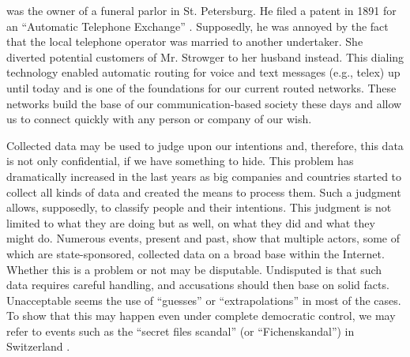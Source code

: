 \documentclass[10pt,journal,compsoc,twocolumn,twoside]{IEEEtran}
\begin{document}
% 
% 
% 
% 
 was the owner of a funeral parlor in St. Petersburg. He filed a patent in 1891 for an ``Automatic Telephone Exchange'' \cite{pulseDialingPatent}. Supposedly, he was annoyed by the fact that the local telephone operator was married to another undertaker. She diverted potential customers of Mr. Strowger to her husband instead. This dialing technology enabled automatic routing for voice and text messages (e.g., telex) up until today and is one of the foundations for our current routed networks. These networks build the base of our communication-based society these days and allow us to connect quickly with any person or company of our wish.

Collected data may be used to judge upon our intentions and, therefore, this data is not only confidential, if we have something to hide. This problem has dramatically increased in the last years as big companies and countries started to collect all kinds of data and created the means to process them. Such a judgment allows, supposedly, to classify people and their intentions. This judgment is not limited to what they are doing but as well, on what they did and what they might do. Numerous events, present and past, show that multiple actors, some of which are state-sponsored, collected data on a broad base within the Internet. Whether this is a problem or not may be disputable. Undisputed is that such data requires careful handling, and accusations should then base on solid facts. Unacceptable seems the use of ``guesses'' or ``extrapolations'' in most of the cases. To show that this may happen even under complete democratic control, we may refer to events such as the ``secret files scandal'' (or  ``Fichenskandal'') in Switzerland
\cite{Leuenberger1989}.
\end{document}
